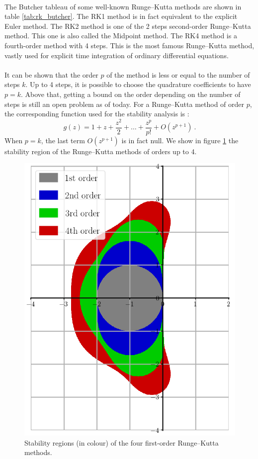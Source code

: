         \paragraph{}
        The Butcher tableau of some well-known Runge--Kutta methods are shown in table \ref{tab:rk_butcher}.
        The RK1 method is in fact equivalent to the explicit Euler method.
        The RK2 method is one of the 2 steps second-order Runge--Kutta method.
        This one is also called the Midpoint method.
        The RK4 method is a fourth-order method with 4 steps.
        This is the most famous Runge--Kutta method, vastly used for explicit time integration of ordinary differential equations.

        \paragraph{}
        It can be shown that the order $p$ of the method is less or equal to the number of steps $k$.
        Up to 4 steps, it is possible to choose the quadrature coefficients to have $p = k$.
        Above that, getting a bound on the order depending on the number of steps is still an open problem as of today.
        For a Runge--Kutta method of order $p$, the corresponding function used for the stability analysis is \cite{HairerWanner1996}:
        \begin{equation}
          g\left(z\right) = 1 + z + \frac{z^2}{2} + \dots + \frac{z^p}{p!} + O\left(z^{p+1}\right) \ .
        \end{equation}
        When $p = k$, the last term $O\left(z^{p+1}\right)$ is in fact null.
        We show in figure \ref{fig:rk_stab} the stability region of the Runge--Kutta methods of orders up to 4.

        \begin{figure}
          \centering
          \includegraphics[width=.45\textwidth]{figures/rk_stab.png}
          \caption{Stability regions (in colour) of the four first-order Runge--Kutta methods.}
          \label{fig:rk_stab}
        \end{figure}

